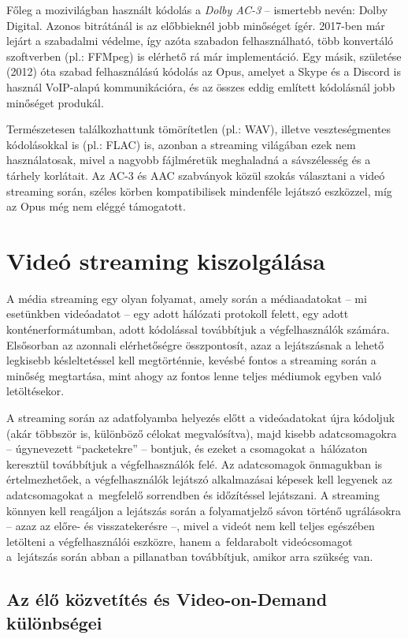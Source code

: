 Főleg a mozivilágban használt kódolás a \emph{Dolby AC-3} -- ismertebb nevén: Dolby Digital. Azonos bitrátánál is az előbbieknél jobb minőséget ígér. 2017-ben már lejárt a szabadalmi védelme, így azóta szabadon felhasználható, több konvertáló szoftverben (pl.: FFMpeg) is elérhető rá már implementáció. Egy másik, születése (2012) óta szabad felhasználású kódolás az Opus, amelyet a Skype és a Discord is használ VoIP-alapú kommunikációra, és az összes eddig említett kódolásnál jobb minőséget produkál.

Természetesen találkozhattunk tömörítetlen (pl.: WAV), illetve veszteségmentes kódolásokkal is (pl.: FLAC) is, azonban a streaming világában ezek nem használatosak, mivel a nagyobb fájlméretük meghaladná a sávszélesség és a tárhely korlátait. Az AC-3 és AAC szabványok közül szokás választani a videó streaming során, széles körben kompatibilisek mindenféle lejátszó eszközzel, míg az Opus még nem eléggé támogatott.

\section{Videó streaming kiszolgálása}\label{streamref}

A média streaming egy olyan folyamat, amely során a médiaadatokat -- mi esetünkben videóadatot -- egy adott hálózati protokoll felett, egy adott konténerformátumban, adott kódolással továbbítjuk a végfelhasználók számára. Elsősorban az azonnali elérhetőségre összpontosít, azaz a lejátszásnak a lehető legkisebb késleltetéssel kell megtörténnie, kevésbé fontos a streaming során a minőség megtartása, mint ahogy az fontos lenne teljes médiumok egyben való letöltésekor.

A streaming során az adatfolyamba helyezés előtt a videóadatokat újra kódoljuk (akár többször is, különböző célokat megvalósítva), majd kisebb adatcsomagokra -- úgynevezett ``packetekre'' -- bontjuk, és ezeket a csomagokat a~hálózaton keresztül továbbítjuk a végfelhasználók felé. Az adatcsomagok önmagukban is értelmezhetőek, a végfelhasználók lejátszó alkalmazásai képesek kell legyenek az adatcsomagokat a~megfelelő sorrendben és időzítéssel lejátszani. A streaming könnyen kell reagáljon a lejátszás során a folyamatjelző sávon történő ugrálásokra -- azaz az előre- és visszatekerésre --, mivel a videót nem kell teljes egészében letölteni a végfelhasználói eszközre, hanem a~feldarabolt videócsomagot a~lejátszás során abban a pillanatban továbbítjuk, amikor arra szükség van.

\subsection{Az élő közvetítés és Video-on-Demand különbségei}

